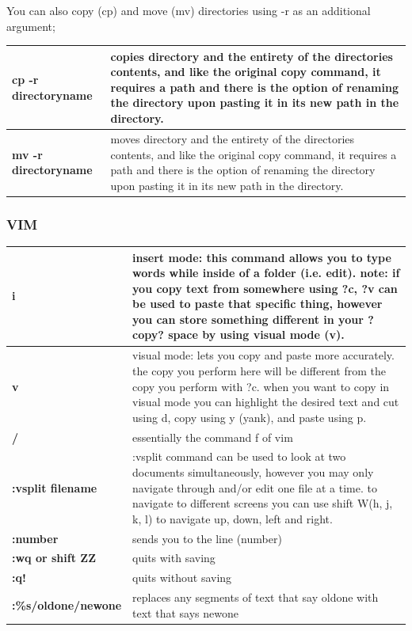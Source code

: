\documentclass{article}
\begin{document}
You can also copy (cp) and move (mv) directories using -r as an additional argument;

\begin{center}
\begin{tabular*}{\textwidth}{ | p{} | p{}| }
\hline
\textbf{cp -r directoryname} & copies directory and the entirety of the directories contents, and like the original copy command, it requires a path and there is the option of renaming the directory upon pasting it in its new path in the directory. \\
\hline 
\textbf{mv -r directoryname} & moves directory and the entirety of the directories contents, and like the original copy command, it requires a path and there is the option of renaming the directory upon pasting it in its new path in the directory. \\
\hline 
\end{tabular*}
\end{center}



\subsubsection{VIM}

\begin{center}
\begin{tabular*}{\textwidth}{ | p{} | p{}| }
\hline
\textbf{i} & insert mode: this command allows you to type words while inside of a folder (i.e. edit). note: if you copy text from somewhere using ?c, ?v can be used to paste that specific thing, however you can store something different in your ?copy? space by using visual mode (v). \\ 
\hline 
\textbf{v} & visual mode: lets you copy and paste more accurately. the copy you perform here will be different from the copy you perform with ?c. when you want to copy in visual mode you can highlight the desired text and cut using d, copy using y (yank), and paste using p. \\ 
\hline
\textbf{/} & essentially the command f of vim \\ 
\hline 
\textbf{:vsplit filename} & :vsplit command can be used to look at two documents simultaneously, however you may only navigate through and/or edit one file at a time. to navigate to different screens you can use shift W(h, j, k, l) to navigate up, down, left and right. \\
\hline 
\textbf{:number} & sends you to the line (number) \\ 
\hline 
\textbf{:wq or shift ZZ} & quits with saving \\ 
\hline 
\textbf{:q!} & quits without saving \\
\hline
\textbf{:\%s/oldone/newone} & replaces any segments of text that say oldone with text that says newone \\
\hline
\end{tabular*}
\end{center}
\end{document}
